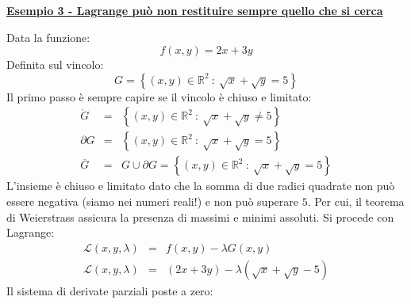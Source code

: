 \documentclass[a4paper]{article}
\newcommand{\example}[1]{\textcolor{Green4}{\textbf{#1}}}
\begin{document}
	\begin{flushleft}
		\example{\underline{Esempio 3 - Lagrange può non restituire sempre quello che si cerca}}
	\end{flushleft}
	Data la funzione:
	\begin{equation*}
		f\left(x,y\right) = 2x+3y
	\end{equation*}
	Definita sul vincolo:
	\begin{equation*}
		G = \left\{\left(x,y\right) \in \mathbb{R}^{2} \: : \: \sqrt{x} + \sqrt{y} = 5\right\}
	\end{equation*}
	Il primo passo è sempre capire se il vincolo è chiuso e limitato:
	\begin{equation*}
		\begin{array}{rcl}
			\mathring{G} &=& \left\{\left(x,y\right) \in \mathbb{R}^{2} \: : \: \sqrt{x} + \sqrt{y} \ne 5\right\} \\ [.5em]
			\partial G &=& \left\{\left(x,y\right) \in \mathbb{R}^{2} \: : \: \sqrt{x} + \sqrt{y} = 5\right\} \\ [.5em]
			\overline{G} &=& G \cup \partial G = \left\{\left(x,y\right) \in \mathbb{R}^{2} \: : \: \sqrt{x} + \sqrt{y} = 5\right\}
		\end{array}
	\end{equation*}
	L'insieme è chiuso e limitato dato che la somma di due radici quadrate non può essere negativa (siamo nei numeri reali!) e non può superare $5$. Per cui, il teorema di Weierstrass assicura la presenza di massimi e minimi assoluti. Si procede con Lagrange:
	\begin{equation*}
		\begin{array}{rcl}
			\mathcal{L}\left(x,y,\lambda\right) &=& f\left(x,y\right) - \lambda G\left(x,y\right) \\ [.5em]
			\mathcal{L}\left(x,y,\lambda\right) &=& \left(2x+3y\right) - \lambda \left(\sqrt{x} + \sqrt{y} - 5\right)
		\end{array}
	\end{equation*}
	Il sistema di derivate parziali poste a zero:
\end{document}
